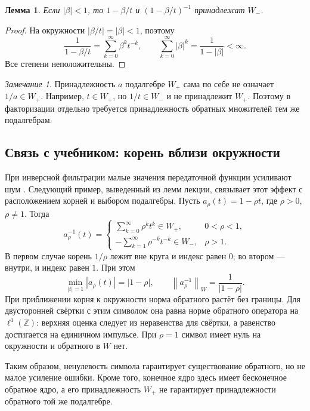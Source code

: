 \documentclass[12pt,a4paper]{article}
\newtheorem{lemma}{Лемма}
\theoremstyle{definition}
\theoremstyle{remark}
\newtheorem*{remark}{Замечание}
\newcommand{\ZZ}{\mathbb{Z}}
\newcommand{\norm}[1]{\left\lVert #1\right\rVert}
\begin{document}
\begin{lemma}
Если $|\beta|<1$, то $1-\beta/t$ и $(1-\beta/t)^{-1}$ принадлежат $W_-$.
\end{lemma}

\begin{proof}
На окружности $|\beta/t|=|\beta|<1$, поэтому
\[
  \frac1{1-\beta/t}=\sum_{k=0}^{\infty}\beta^kt^{-k},\qquad
  \sum_{k=0}^{\infty}|\beta|^k=\frac1{1-|\beta|}<\infty.
\]
Все степени неположительны.
\end{proof}

\begin{remark}
Принадлежность $a$ подалгебре $W_+$ сама по себе не означает
$1/a\in W_+$. Например, $t\in W_+$, но $1/t\in W_-$ и не принадлежит
$W_+$. Поэтому в факторизации отдельно требуется принадлежность
обратных множителей тем же подалгебрам.
\end{remark}

\subsection{Связь с учебником: корень вблизи окружности}

При инверсной фильтрации малые значения передаточной функции
усиливают шум \cite[\S\,5.7, с.~412]{GW2012}.
Следующий пример, выведенный из лемм лекции, связывает этот эффект
с расположением корней и выбором подалгебры. Пусть
$a_\rho(t)=1-\rho t$, где $\rho>0$, $\rho\ne1$. Тогда
\[
  a_\rho^{-1}(t)=
  \begin{cases}
    \displaystyle\sum_{k=0}^{\infty}\rho^k t^k\in W_+,
       &0<\rho<1,\\[6pt]
    \displaystyle-\sum_{k=1}^{\infty}\rho^{-k}t^{-k}\in W_-,
       &\rho>1.
  \end{cases}
\]
В первом случае корень $1/\rho$ лежит вне круга и индекс равен $0$;
во втором --- внутри, и индекс равен $1$. При этом
\[
  \min_{|t|=1}|a_\rho(t)|=|1-\rho|,\qquad
  \norm{a_\rho^{-1}}_W=\frac1{|1-\rho|}.
\]
При приближении корня к окружности норма обратного растёт без границы.
Для двусторонней свёртки с этим символом она равна норме обратного
оператора на $\ell^1(\ZZ)$: верхняя оценка следует из неравенства
для свёртки, а равенство достигается на единичном импульсе.
При $\rho=1$ символ имеет нуль на окружности и обратного в $W$ нет.

Таким образом, ненулевость символа гарантирует существование
обратного, но не малое усиление ошибки. Кроме того, конечное ядро
здесь имеет бесконечное обратное ядро, а его принадлежность $W_+$
не гарантирует принадлежности обратного той же подалгебре.
\end{document}
